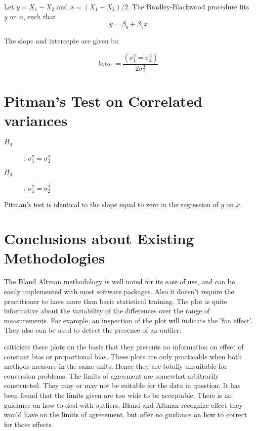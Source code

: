 \documentclass[12pt, a4paper]{report}
\theoremstyle{plain}
\theoremstyle{definition}
\theoremstyle{remark}
\begin{document}
Let $y = X_1 - X_2$ and $x= (X_1 - X_2)/2$.
The Bradley-Blackwood procedure fits $y$ on $x$, such that
\[ y = \beta_0 + \beta_1x \]

The slope and intercepte are given bu

\[beta_1 =  \frac{(\sigma^2_1 = \sigma^2_2)}{2\sigma^2_x}\]


\section*{Pitman's Test on Correlated variances}
\begin{description}
	\item[$H_0$] : $\sigma^2_1 = \sigma^2_2$
	\item[$H_0$] : $\sigma^2_1 = \sigma^2_2$
\end{description}


Pitman's test is identical to the slope equal to zero in the regression of $y$ on $x$.




\section{Conclusions about Existing Methodologies}

The Bland Altman methodology is well noted for its ease of use,
and can be easily implemented with most software packages. Also it
doesn't require the practitioner to have more than basic
statistical training. The plot is quite informative about the
variability of the differences over the range of measurements. For
example, an inspection of the plot will indicate the 'fan effect'.
They also can be used to detect the presence of an outlier.

\citet{ludbrook97,ludbrook02} criticizes these plots on the
basis that they presents no information on effect of constant bias
or proportional bias. These plots are only practicable when both
methods measure in the same units. Hence they are totally
unsuitable for conversion problems. The limits of agreement are
somewhat arbitrarily constructed. They may or may not be suitable
for the data in question. It has been found that the limits given
are too wide to be acceptable. There is no guidance on how to deal
with outliers. Bland and Altman recognize effect they would have
on the limits of agreeement, but offer no guidance on how to
correct for those effects.
\end{document}
